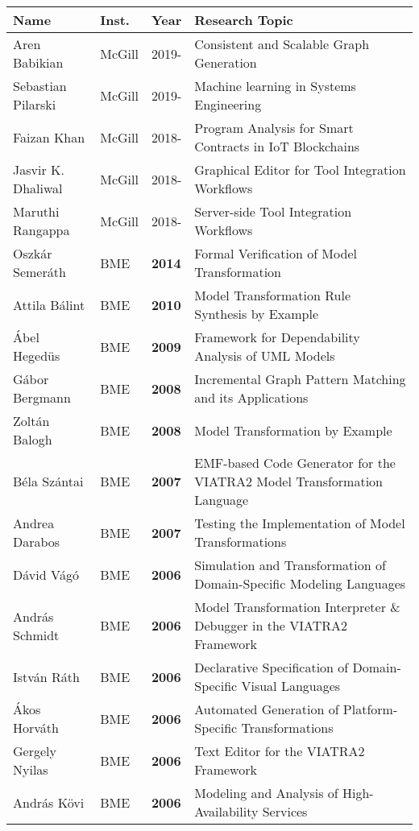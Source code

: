\begin{table}[htb]
\footnotesize
\begin{tabular}{@{}lllp{11cm}@{}}
\toprule
\textbf{Name} & \textbf{Inst.} & \textbf{Year} & \textbf{Research Topic} \\ \midrule
Aren Babikian & McGill & 2019-   & Consistent and Scalable Graph Generation \\
Sebastian Pilarski & McGill & 2019- & Machine learning in Systems Engineering \\
Faizan Khan & McGill & 2018-   & Program Analysis for Smart Contracts in IoT Blockchains \\
Jasvir K. Dhaliwal & McGill & 2018-   & Graphical Editor for Tool Integration Workflows \\
Maruthi Rangappa & McGill  & 2018-   & Server-side Tool Integration Workflows \\ \midrule
Oszk\'ar Semer\'ath & BME & \textbf{2014} & Formal Verification of Model Transformation\\ 
Attila B\'alint & BME & \textbf{2010} & Model Transformation Rule Synthesis by Example\\ 
\'Abel Heged\"us & BME & \textbf{2009} & Framework for Dependability Analysis of UML Models\\ 
G\'abor Bergmann & BME  & \textbf{2008} & Incremental Graph Pattern Matching and its Applications\\ 
Zolt\'an Balogh & BME & \textbf{2008} & Model Transformation by Example\\ 
B\'ela Sz\'antai & BME & \textbf{2007} & EMF-based Code Generator for the VIATRA2 Model Transformation Language \\ 
Andrea Darabos & BME & \textbf{2007} & Testing the Implementation of Model Transformations\\ 
D\'avid V\'ag\'o & BME & \textbf{2006} & Simulation and Transformation of Domain-Specific Modeling Languages\\ 
Andr\'as Schmidt & BME & \textbf{2006} & Model Transformation Interpreter \& Debugger in the VIATRA2 Framework\\ 
Istv\'an R\'ath & BME & \textbf{2006} & Declarative Specification of Domain-Specific Visual Languages\\ 
\'Akos Horv\'ath & BME & \textbf{2006} & Automated Generation of Platform-Specific Transformations\\ 
Gergely Nyilas & BME & \textbf{2006} & Text Editor for the VIATRA2 Framework \\ 
Andr\'as K\"ovi & BME  & \textbf{2006} & Modeling and Analysis of High-Availability Services \\ 

\end{tabular}
\end{table}
